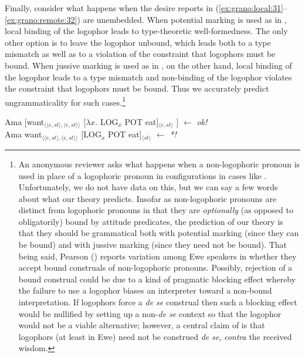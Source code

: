 \documentclass[output=paper,modfonts,nonflat]{langsci/langscibook}
\begin{document}
Finally, consider what happens when the desire reports in (\ref{ex:grano:local:31}--\ref{ex:grano:remote:32}) are unembedded. When potential marking is used as in , local binding of the logophor leads to type-theoretic well-formedness. The only other option is to leave the logophor unbound, which leads both to a type mismatch as well as to a violation of the constraint that logophors must be bound. When jussive marking is used as in , on the other hand, local binding of the logophor leads to a type mismatch and non-binding of the logophor violates the constraint that logophors must be bound. Thus we accurately predict ungrammaticality for such cases.\footnote{An anonymous reviewer asks what happens when a non-logophoric pronoun is used in place of a logophoric pronoun in configurations in cases like . Unfortunately, we do not have data on this, but we can say a few words about what our theory predicts. Insofar as non-logophoric pronouns are distinct from logophoric pronouns in that they are \emph{optionally} (as opposed to obligatorily) bound by attitude predicates, the prediction of our theory is that they should be grammatical both with potential marking (since they can be bound) and with jussive marking (since they need not be bound). That being said, Pearson (\citeyear[97]{Pearson2015}) reports variation among Ewe speakers in whether they accept bound construals of non-logophoric pronouns. Possibly, rejection of a bound construal could be due to a kind of pragmatic blocking effect whereby the failure to use a logophor biases an interpreter toward a non-bound interpretation. If logophors force a \emph{de se} construal then such a blocking effect would be nullified by setting up a non-\emph{de se} context so that the logophor would not be a viable alternative; however, a central claim of \cite{Pearson2015} is that logophors (at least in Ewe) need not be construed \emph{de se}, \emph{contra} the received wisdom.}



\ea \label{ex:grano:local':33}
    \begin{xlist}
    \ex Ama [want$_{\langle\langle e,st\rangle,\langle e,st\rangle\rangle}$ [$\lambda x$. LOG$_{x}$ POT eat]$_{\langle e,st\rangle}$ ] \hfill $\leftarrow$ \emph{ok!}\\
    \ex Ama want$_{\langle\langle e,st\rangle,\langle e,st\rangle\rangle}$ [LOG$_{x}$ POT eat]$_{\langle st\rangle}$  \hfill $\leftarrow$ \emph{*!} 
    \end{xlist}
\z
\end{document}
